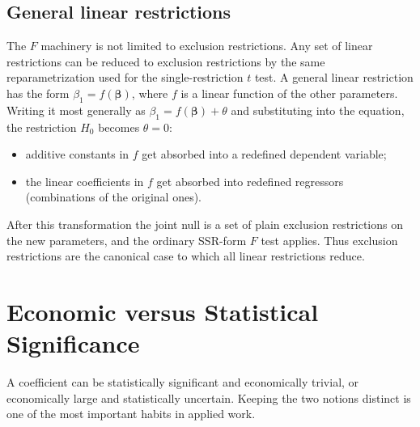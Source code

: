 \subsection{General linear restrictions}

The $F$ machinery is not limited to exclusion restrictions. Any set of linear restrictions can be reduced to exclusion restrictions by the same reparametrization used for the single-restriction $t$ test. A general linear restriction has the form $\beta_1 = f(\boldsymbol\beta)$, where $f$ is a linear function of the other parameters. Writing it most generally as $\beta_1 = f(\boldsymbol\beta) + \theta$ and substituting into the equation, the restriction $H_0$ becomes $\theta = 0$:
\begin{itemize}
\item additive constants in $f$ get absorbed into a redefined dependent variable;
\item the linear coefficients in $f$ get absorbed into redefined regressors (combinations of the original ones).
\end{itemize}
After this transformation the joint null is a set of plain exclusion restrictions on the new parameters, and the ordinary SSR-form $F$ test applies. Thus exclusion restrictions are the canonical case to which all linear restrictions reduce.

\section{Economic versus Statistical Significance}

A coefficient can be statistically significant and economically trivial, or economically large and statistically uncertain. Keeping the two notions distinct is one of the most important habits in applied work.


